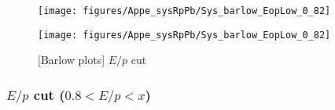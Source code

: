 \begin{itemize}
      \begin{figure}[H]
      \begin{minipage}{0.5\hsize} 
      \begin{center}
      \texttt{[image: figures/Appe\_sysRpPb/Sys\_barlow\_EopLow\_0\_82]}
      \end{center}
      \end{minipage}
      \begin{minipage}{0.5\hsize} 
      \begin{center}
      \texttt{[image: figures/Appe\_sysRpPb/Sys\_barlow\_EopLow\_0\_82]}
      \end{center}
      \end{minipage}
      \caption{[Barlow plots] $E/p$ cut}
      \label{fig:Sys_EopLow}
      \end{figure}
      
  \end{itemize}


\subsubsection{$E/p$ cut ($0.8 < E/p < x $)}
\label{subsub:appe_sys_RpPb_EopHigh}

